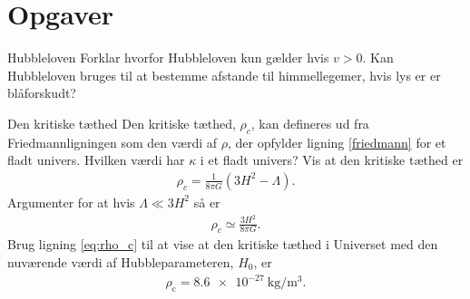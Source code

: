 \section{Opgaver}

\begin{opgave}{Hubbleloven}
    \opg Forklar hvorfor Hubbleloven kun gælder hvis $v>0$.
    \opg Kan Hubbleloven bruges til at bestemme afstande til himmellegemer, hvis lys er er blåforskudt?
\end{opgave}

\begin{opgave}{Den kritiske tæthed}
Den kritiske tæthed, $\rho_c$, kan defineres ud fra Friedmannligningen som den værdi af $\rho$, der opfylder ligning \eqref{friedmann} for et fladt univers.
\opg Hvilken værdi har $\kappa$ i et fladt univers?
\opg Vis at den kritiske tæthed er
%
\begin{align}
    \rho_c = \frac{1}{8\pi G}\left(3H^2 - \Lambda\right).
\end{align}
%
\opg Argumenter for at hvis $\Lambda \ll 3H^2$ så er
%
\begin{align} \label{eq:rho_c}
    \rho_c \simeq \frac{3H^2}{8\pi G}.
\end{align}
%
\opg Brug ligning \eqref{eq:rho_c} til at vise at den kritiske tæthed i Universet med den nuværende værdi af Hubbleparameteren, $H_0$, er
%
\begin{align*}
    \rho_\text{c} = \SI{8.6e-27}{\kilo\gram\per\cubic\metre}.
\end{align*}
\end{opgave}

